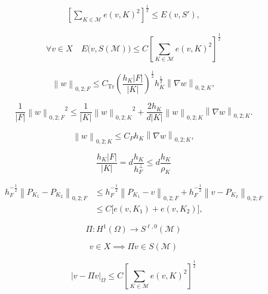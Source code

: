 \documentclass[a4paper]{article}
\begin{document}
\begin{align}
\label{local<=global}
 \left[
  \sum_{{K}\in{\mathcal{M}}} e(v,{K})^2
 \right]^{\frac12}
 \leq
  E(v,{S}'),
\end{align}

\begin{equation}
\label{global<=Clocal}
 \forall v\in X
\quad
 E\big( v,{S}({\mathcal{M}}) \big)
 \leq
 C  \left[
  \sum_{{K}\in{\mathcal{M}}} e(v,{K})^2
 \right]^{\frac12}
\end{equation}

\[
 {{\left\|{{w}}\right\|_{{0,2;{F}}}}}
 \leq
 {{C_\text{Tr}}} \left(
   \frac{h_{K} {\left|{F}\right|}}{{\left|{K}\right|}}
  \right)^{\frac12}
  h_{K}^{\frac12} {{\left\|{{{\nabla} w}}\right\|_{{0,2;{K}}}}},
\]

\begin{equation*}
 \frac1{{\left|{F}\right|}} {{\left\|{{w}}\right\|_{{0,2;{F}}}}}^2
 \leq
 \frac1{{\left|{K}\right|}} {{\left\|{{w}}\right\|_{{0,2;{K}}}}}^2
 +
 \frac{2h_{K}}{d{\left|{K}\right|}} {{\left\|{{w}}\right\|_{{0,2;{K}}}}}
  {{\left\|{{{\nabla} w}}\right\|_{{0,2;{K}}}}}.
\end{equation*}

\begin{equation*}
 {{\left\|{{w}}\right\|_{{0,2;{K}}}}}
 \leq
 C_P h_{K} {{\left\|{{{\nabla} w}}\right\|_{{0,2;{K}}}}},
\end{equation*}

\[
 \frac{h_{K} {\left|{F}\right|}}{{\left|{K}\right|}}
 =
 d\frac{h_{K}}{h^\perp_F}
 \leq
 d\frac{h_{K}}{\rho_{K}}
\]

\begin{align*}
 h_{F}^{-\frac12} {{\left\|{{P_{{K}_1}-P_{{K}_2}}}\right\|_{{0,2;{F}}}}}
 &\leq
 h_{F}^{-\frac12} {{\left\|{{P_{{K}_1}-v}}\right\|_{{0,2;{F}}}}}
  + 
  h_{F}^{-\frac12} {{\left\|{{v-P_{{K}_2}}}\right\|_{{0,2;{F}}}}}
\\
 &\leq
 C \big[ e(v,{K}_1) + e(v,{K}_2) \big],
\end{align*}

\[
 {\Pi}:{H^{{1}}}(\Omega)\to{S}^{{\ell},0}({\mathcal{M}})
\]

\begin{equation}
\label{Ip;BdryVals}
 v\in X
 \implies
 {\Pi} v\in{S}({\mathcal{M}})
\end{equation}

\begin{equation}
\label{GDcplng}
 {\left|{v-{\Pi} v}\right|_{{\Omega}}}
 \leq
 C \left[
  \sum_{{K}\in{\mathcal{M}}} e(v,{K})^2
 \right]^{\frac12}
\end{equation}
\end{document}
